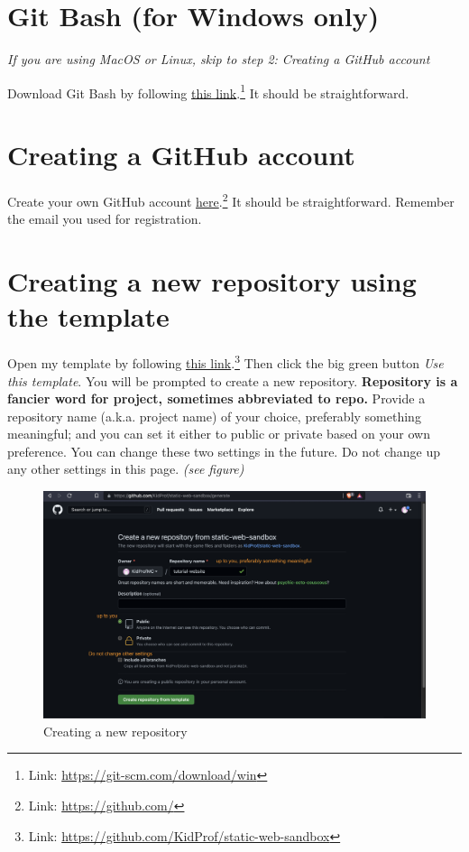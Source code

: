 \section{Git Bash (for Windows only)}

\textit{If you are using MacOS or Linux, skip to step 2: Creating a GitHub account}
\vspace{6mm}

Download Git Bash by following \href{https://git-scm.com/download/win}{this link}.\footnote{Link: \href{https://git-scm.com/download/win}{https://git-scm.com/download/win}} It should be straightforward.

\section{Creating a GitHub account}

Create your own GitHub account \href{https://github.com/}{here}.\footnote{Link: \href{https://github.com/}{https://github.com/}} It should be straightforward. Remember the email you used for registration.

\section{Creating a new repository using the template}

Open my template by following \href{https://github.com/KidProf/static-web-sandbox}{this link}.\footnote{Link: \href{https://github.com/KidProf/static-web-sandbox}{https://github.com/KidProf/static-web-sandbox}} Then click the big green button \textit{Use this template}. You will be prompted to create a new repository. \textbf{Repository is a fancier word for project, sometimes abbreviated to repo.} Provide a repository name (a.k.a. project name) of your choice, preferably something meaningful; and you can set it either to public or private based on your own preference. You can change these two settings in the future. Do not change up any other settings in this page. \textit{(see figure)}

\begin{figure}[h]
\centering
\includegraphics[width=15cm]{images/ch1-create-new-repo.png}
\caption{Creating a new repository}
\end{figure}

